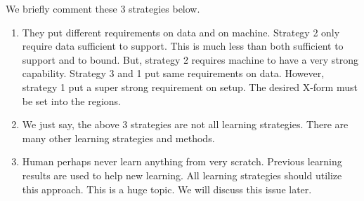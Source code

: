 We briefly comment these 3 strategies below.
\begin{enumerate} [topsep=0pt,itemsep=-1ex,partopsep=1ex,parsep=1ex]
\item They put different requirements on data and on machine. Strategy 2 only require data sufficient to support. This is much less than both sufficient to support and to bound. But, strategy 2 requires machine to have a very strong capability. Strategy 3 and 1 put same requirements on data. However, strategy 1 put a super strong requirement on setup. The desired X-form must be set into the regions.  
\item We just say, the above 3 strategies are not all learning strategies. There are many other learning strategies and methods.
\item Human perhaps never learn anything from very scratch. Previous learning results are used to help new learning. All learning strategies should utilize this approach. This is a huge topic. We will discuss this issue later.
\end{enumerate}


